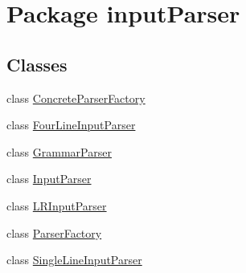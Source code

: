 \hypertarget{namespaceinput_parser}{\section{Package input\-Parser}
\label{namespaceinput_parser}
}
\subsection*{Classes}
\begin{DoxyCompactItemize}
\item 
class \hyperlink{classinput_parser_1_1_concrete_parser_factory}{Concrete\-Parser\-Factory}
\item 
class \hyperlink{classinput_parser_1_1_four_line_input_parser}{Four\-Line\-Input\-Parser}
\item 
class \hyperlink{classinput_parser_1_1_grammar_parser}{Grammar\-Parser}
\item 
class \hyperlink{classinput_parser_1_1_input_parser}{Input\-Parser}
\item 
class \hyperlink{classinput_parser_1_1_l_r_input_parser}{L\-R\-Input\-Parser}
\item 
class \hyperlink{classinput_parser_1_1_parser_factory}{Parser\-Factory}
\item 
class \hyperlink{classinput_parser_1_1_single_line_input_parser}{Single\-Line\-Input\-Parser}
\end{DoxyCompactItemize}
